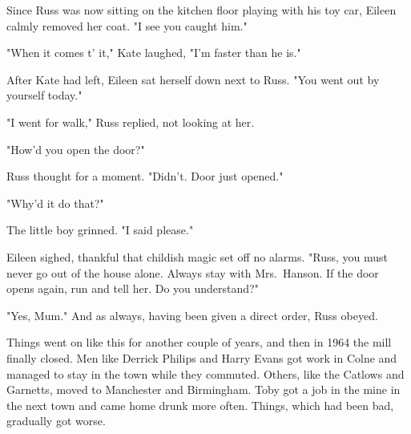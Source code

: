 Since Russ was now sitting on the kitchen floor playing with his toy car, Eileen calmly removed her coat. "I see you caught him."

"When it comes t' it," Kate laughed, "I'm faster than he is."

After Kate had left, Eileen sat herself down next to Russ. "You went out by yourself today."

"I went for walk," Russ replied, not looking at her.

"How'd you open the door?"

Russ thought for a moment. "Didn't. Door just opened."

"Why'd it do that?"

The little boy grinned. "I said please."

Eileen sighed, thankful that childish magic set off no alarms. "Russ, you must never go out of the house alone. Always stay with Mrs.~Hanson. If the door opens again, run and tell her. Do you understand?"

"Yes, Mum." And as always, having been given a direct order, Russ obeyed.

Things went on like this for another couple of years, and then in 1964 the mill finally closed. Men like Derrick Philips and Harry Evans got work in Colne and managed to stay in the town while they commuted. Others, like the Catlows and Garnetts, moved to Manchester and Birmingham. Toby got a job in the mine in the next town and came home drunk more often. Things, which had been bad, gradually got worse.
